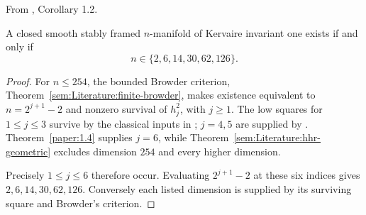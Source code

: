 \begin{corollary}
\label{paper:1.2}
From \cite{LWX126}, Corollary 1.2.\par

A closed smooth stably framed $n$-manifold of Kervaire invariant one
exists if and only if
\[
 n\in\{2,6,14,30,62,126\}.
\]



\end{corollary}
\begin{proof}
For $n\leq254$, the bounded Browder criterion,
Theorem~\ref{sem:Literature:finite-browder}, makes existence equivalent
to $n=2^{j+1}-2$ and nonzero survival of $h_j^2$, with $j\ge1$.
The low squares for $1\le j\le3$ survive by the classical inputs in
\cite{MayThesis1964}; $j=4,5$ are supplied by
\cite{MahowaldTangora,BJMtheta5}. Theorem~\ref{paper:1.4} supplies
$j=6$, while Theorem~\ref{sem:Literature:hhr-geometric} excludes
dimension $254$ and every higher dimension.

Precisely $1\le j\le6$ therefore occur. Evaluating $2^{j+1}-2$ at these six
indices gives $2,6,14,30,62,126$. Conversely each listed dimension is
supplied by its surviving square and Browder's criterion.
\end{proof}
